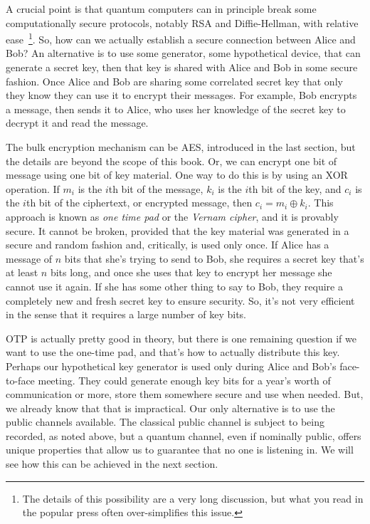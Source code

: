 A crucial point is that quantum computers can in principle break some computationally secure protocols, notably RSA and Diffie-Hellman, with relative ease~\footnote{The details of this possibility are a very long discussion, but what you read in the popular press often over-simplifies this issue.}. So, how can we actually establish a secure connection between Alice and Bob? An alternative is to use some generator, some hypothetical device, that can generate a secret key, then that key is shared with Alice and Bob in some secure fashion. Once Alice and Bob are sharing some correlated secret key that only they know they can use it to encrypt their messages. For example, Bob encrypts a message, then sends it to Alice, who uses her knowledge of the secret key to decrypt it and read the message.

The bulk encryption mechanism can be AES, introduced in the last section, but the details are beyond the scope of this book. Or, we can encrypt one bit of message using one bit of key material.  One way to do this is by using an XOR operation.  If $m_i$ is the $i$th bit of the message, $k_i$ is the $i$th bit of the key, and $c_i$ is the $i$th bit of the ciphertext, or encrypted message, then $c_i = m_i \oplus k_i$.  This approach is known as \emph{one time pad} or the \emph{Vernam cipher}, and it is provably secure. It cannot be broken, provided that the key material was generated in a secure and random fashion and, critically, is used only once. If Alice has a message of $n$ bits that she's trying to send to Bob, she requires a secret key that's at least $n$ bits long, and once she uses that key to encrypt her message she cannot use it again. If she has some other thing to say to Bob, they require a completely new and fresh secret key to ensure security. So, it's not very efficient in the sense that it requires a large number of key bits.

OTP is actually pretty good in theory, but there is one remaining question if we want to use the one-time pad, and that's how to actually distribute this key.  Perhaps our hypothetical key generator is used only during Alice and Bob's face-to-face meeting. They could generate enough key bits for a year's worth of communication or more, store them somewhere secure and use when needed.  But, we already know that that is impractical.  Our only alternative is to use the public channels available.  The classical public channel is subject to being recorded, as noted above, but a quantum channel, even if nominally public, offers unique properties that allow us to guarantee that no one is listening in.  We will see how this can be achieved in the next section.

